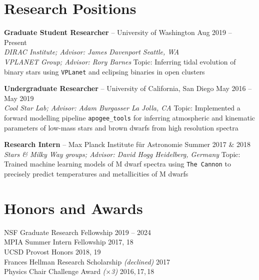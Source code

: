 \documentclass[margin,line]{resume}
\begin{document}
\begin{resume}

\section{\mysidestyle \textcolor{bcolor}{Research Positions}}

\textbf{Graduate Student Researcher} -- University of Washington \hfill Aug 2019 -- Present \\
\textsl{DIRAC Institute; Advisor: James Davenport \hfill Seattle, WA} \\
\textsl{VPLANET Group; Advisor: Rory Barnes} 
\vspace{.1cm} \newline
Topic: Inferring tidal evolution of binary stars using \texttt{VPLanet} and eclipsing binaries in open clusters

\textbf{Undergraduate Researcher} -- University of California, San Diego \hfill May 2016 -- May 2019  \\
\textsl{Cool Star Lab; Advisor: Adam Burgasser \hfill La Jolla, CA} 
\vspace{.1cm} \newline
Topic: Implemented a forward modelling pipeline \texttt{apogee\_tools} for inferring atmospheric and kinematic parameters of low-mass stars and brown dwarfs from high resolution spectra

\textbf{Research Intern} -- Max Planck Institute f{\"u}r Astronomie \hfill Summer 2017 \& 2018 \\
\textsl{Stars \& Milky Way groups; Advisor: David Hogg \hfill Heidelberg, Germany} 
\vspace{.1cm} \newline
Topic: Trained machine learning models of M dwarf spectra using \texttt{The Cannon} to precisely predict temperatures and metallicities of M dwarfs


\section{\mysidestyle \textcolor{bcolor}{Honors and Awards}}
NSF Graduate Research Fellowship \hfill 2019 -- 2024 \\
MPIA Summer Intern Fellowship \hfill 2017, 18 \\
UCSD Provost Honors \hfill 2018, 19 \\
Frances Hellman Research Scholarship \textit{(declined)} \hfill 2017 \\
Physics Chair Challenge Award \textit{($\times$3)} \hfill 2016,\,17,\,18 



\end{resume}
\end{document}
